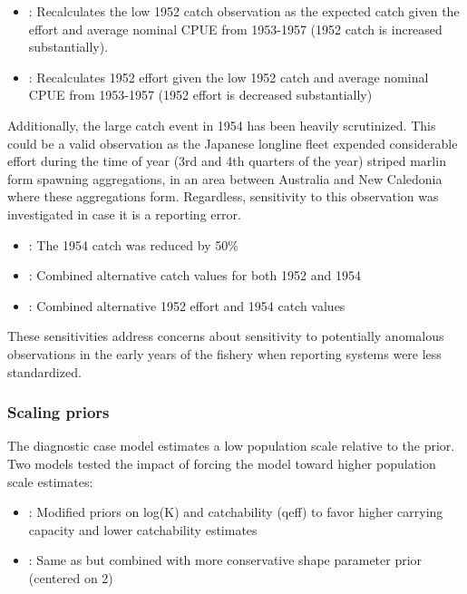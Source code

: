 \documentclass[
  11pt,
]{SCreport}
\providecommand{\tightlist}{%
  \setlength{\itemsep}{0pt}\setlength{\parskip}{0pt}}\usepackage{longtable,booktabs,array}
\begin{document}
\begin{itemize}
\tightlist
\item
  : Recalculates the low 1952 catch observation as the
  expected catch given the effort and average nominal CPUE from
  1953-1957 (1952 catch is increased substantially).
\item
  : Recalculates 1952 effort given the low 1952 catch
  and average nominal CPUE from 1953-1957 (1952 effort is decreased
  substantially)
\end{itemize}

Additionally, the large catch event in 1954 has been heavily
scrutinized. This could be a valid observation as the Japanese longline
fleet expended considerable effort during the time of year (3rd and 4th
quarters of the year) striped marlin form spawning aggregations, in an
area between Australia and New Caledonia where these aggregations form.
Regardless, sensitivity to this observation was investigated in case it
is a reporting error.

\begin{itemize}
\tightlist
\item
  : The 1954 catch was reduced by 50\%
\item
  : Combined alternative catch values for both 1952 and
  1954
\item
  : Combined alternative 1952 effort and 1954 catch
  values
\end{itemize}

These sensitivities address concerns about sensitivity to potentially
anomalous observations in the early years of the fishery when reporting
systems were less standardized.

\subsubsection{Scaling priors}\label{sec-desc-sens-scaling}

The diagnostic case model estimates a low population scale relative to
the prior. Two models tested the impact of forcing the model toward
higher population scale estimates:

\begin{itemize}
\tightlist
\item
  : Modified priors on log(K) and catchability (qeff)
  to favor higher carrying capacity and lower catchability estimates
\item
  : Same as  but combined with more
  conservative shape parameter prior (centered on 2)
\end{itemize}
\end{document}
